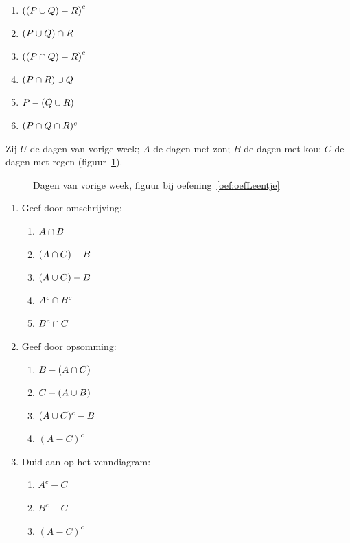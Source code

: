 \begin{oef}
\begin{opl}
\begin{enumerate}
\item $\left(\left(P\cup Q\right)-R\right)^c$
\item $\left(P\cup Q\right) \cap R$
\item $\left(\left(P\cap Q\right)-R\right)^c$
\item $(P\cap R)\cup Q$
\item $P-(Q\cup R)$
\item $(P\cap Q \cap R)^c$
\end{enumerate}
\end{opl}
\end{oef}



\newpage
\begin{oef}
\label{oef:oefLeentje}
%
Zij $U$ de dagen van vorige week; $A$ de dagen met zon; $B$ de dagen met kou; $C$ de dagen met regen (figuur~\ref{fig:dagen}).
\begin{figure}[htbp]
\centering

\caption{Dagen van vorige week, figuur bij oefening~\ref{oef:oefLeentje}}
\label{fig:dagen}
\end{figure}
\begin{enumerate}
\item Geef door omschrijving:
\begin{enumerate}
\item $A\cap B$
\item $(A\cap C)-B$
\item $(A\cup C)-B$
\item $A^c\cap B^c$
\item $B^c\cap C$
\end{enumerate}
\item Geef door opsomming:
\begin{enumerate}
\item $B-(A\cap C)$
\item $C-(A\cup B)$
\item $(A\cup C)^c-B$
\item $(A-C)^c$
\end{enumerate}
\item Duid aan op het venndiagram:
\begin{enumerate}
\item $A^c-C$
\item $B^c -C$
\item $(A-C)^c$
\end{enumerate}
\end{enumerate}


\end{oef}

